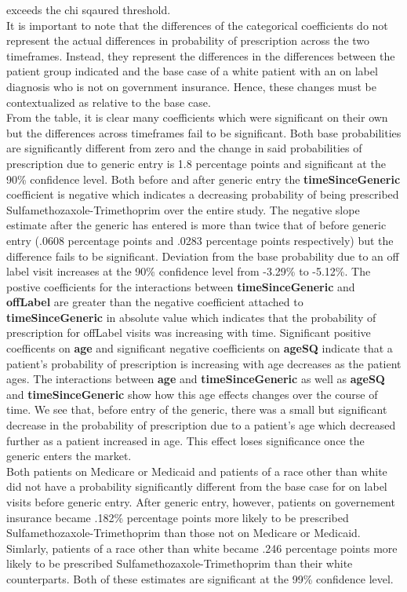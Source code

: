 exceeds the chi sqaured threshold.\\
\indent It is important to note that the differences of the categorical coefficients do not represent the actual differences in probability of prescription across the two timeframes. Instead, they represent the differences in the differences between the patient group indicated and the base case of a white patient with an on label diagnosis who is not on government insurance. Hence, these changes must be contextualized as relative to the base case.\\
\indent From the table, it is clear many coefficients which were significant on their own but the differences across timeframes fail to be significant. Both base probabilities are significantly different from zero and the change in said probabilities of prescription due to generic entry is 1.8 percentage points and significant at the 90\% confidence level. Both before and after generic entry the \textbf{timeSinceGeneric} coefficient is negative which indicates a decreasing probability of being prescribed Sulfamethozaxole-Trimethoprim over the entire study. The negative slope estimate after the generic has entered is more than twice that of before generic entry (.0608 percentage points and .0283 percentage points respectively) but the difference fails to be significant. Deviation from the base probability due to an off label visit increases at the 90\% confidence level from -3.29\% to -5.12\%. The postive coefficients for the interactions between \textbf{timeSinceGeneric} and \textbf{offLabel} are greater than the negative coefficient attached to \textbf{timeSinceGeneric} in absolute value which indicates that the probability of prescription for offLabel visits was increasing with time. Significant positive coefficents on \textbf{age} and significant negative coefficients on \textbf{ageSQ} indicate that a patient's probability of prescription is increasing with age decreases as the patient ages. The interactions between \textbf{age} and \textbf{timeSinceGeneric} as well as \textbf{ageSQ} and \textbf{timeSinceGeneric} show how this age effects changes over the course of time. We see that, before entry of the generic, there was a small but significant decrease in the probability of prescription due to a patient's age which decreased further as a patient increased in age. This effect loses significance once the generic enters the market.\\
\indent Both patients on Medicare or Medicaid and patients of a race other than white did not have a probability significantly different from the base case for on label visits before generic entry. After generic entry, however, patients on governement insurance became .182\% percentage points more likely to be prescribed Sulfamethozaxole-Trimethoprim than those not on Medicare or Medicaid. Simlarly, patients of a race other than white became .246 percentage points more likely to be prescribed Sulfamethozaxole-Trimethoprim than their white counterparts. Both of these estimates are significant at the 99\% confidence level. 


